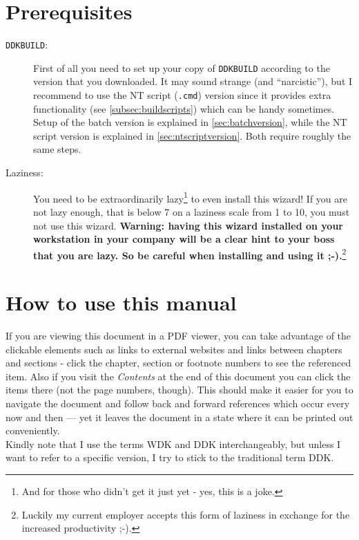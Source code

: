 \documentclass[a4paper,titlepage]{report}
\begin{document}
\section*{Prerequisites}
\begin{description}
  \item[\texttt{DDKBUILD}:] First of all you need to set up your copy of \texttt{DDKBUILD} according to the version
that you downloaded. It may sound strange (and ``narcistic''), but I recommend to
use the NT script (\texttt{.cmd}) version since it provides extra functionality
(see \autoref{subsec:buildscripts})
which can be handy sometimes. Setup of the batch version is explained in \autoref{sec:batchversion},
while the NT script version is explained in \autoref{sec:ntscriptversion}. Both
require roughly the same steps.
  \item[Laziness:]
  You need to be extraordinarily lazy\footnote{And for those who didn't get it just yet - yes, this is a joke.}
  to even install this wizard! If you are not lazy enough, that is below 7 on a laziness scale from 1 to 10, you
must not use this wizard.
\textbf{Warning: having this wizard installed on your workstation in your
company will be a clear hint to your boss that you are lazy. So be careful when
installing and using it \textsf{;-)}.}\footnote{Luckily my current employer accepts
this form of laziness in exchange for the increased productivity \textsf{;-)}.}
\end{description}

\section*{How to use this manual}
If you are viewing this document in a PDF viewer, you can take advantage of the
clickable elements such as links to external websites and links between
chapters and sections - click the chapter, section or footnote numbers to
see the referenced item. Also if you visit the \emph{Contents} at the end of
this document you can click the items there (not the page numbers, though).
This should make it easier for you to navigate the document and follow
back and forward references which occur every now and then --- yet it leaves
the document in a state where it can be printed out conveniently.\\
Kindly note that I use the terms WDK and DDK interchangeably, but unless I
want to refer to a specific version, I try to stick to the traditional term
DDK.
\end{document}

